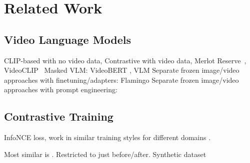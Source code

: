 \chapter{Related Work}
\label{chap:rel}

\section{Video Language Models}
\label{sec:vidlm}

CLIP-based \citep{radford2021clip} with no video data, 
Contrastive with video data, Merlot Reserve~\cite{zellers2022mreserve}, VideoCLIP~\cite{xu2021videoclip}
Masked VLM: VideoBERT \citep{sun2019videobert}, VLM \citep{xu2021vlm}
Separate frozen image/video approaches with finetuning/adapters: Flamingo \citep{alayrac2022flamingo}
Separate frozen image/video approaches with prompt engineering: \citep{wang2022vidil, zeng2023socratic}


\section{Contrastive Training}
\label{sec:contrastive}

InfoNCE loss, work in similar training styles for different domains
\citep{momeni2023verbs, yuksekgonul2023when}.

Most similar is \cite{bagad2023testoftime}. Restricted to just before/after.
Synthetic dataset

